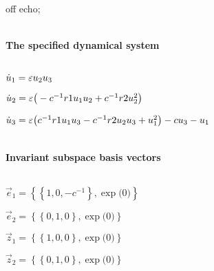 
off echo;


\(\)
\paragraph{The specified dynamical system}
\(
\)\par

\(\dot u_{1}=\varepsilon u\sb2 u\sb3
\)\par

\(\dot u_{2}=\varepsilon \big(-c^{-1} r1 u\sb1 u\sb2+c^{-1} r2 u\sb2^{2}\big)
\)\par

\(\dot u_{3}=\varepsilon \big(c^{-1} r1 u\sb1 u\sb3-c^{-1} r2 u\sb2 u\sb3+u\sb1^{
2}\big)-c u\sb3-u\sb1
\)\par

\(\)
\paragraph{Invariant subspace basis vectors}
\(
\)\par

\(\vec e_{1}=\left\{
\left\{
1 , 0 , -c^{-1}
\right\} , \exp \big(0\big)
\right\}
\)\par

\(\vec e_{2}=\left\{
\left\{
0 , 1 , 0
\right\} , \exp \big(0\big)
\right\}
\)\par

\(\vec z_{1}=\left\{
\left\{
1 , 0 , 0
\right\} , \exp \big(0\big)
\right\}
\)\par

\(\vec z_{2}=\left\{
\left\{
0 , 1 , 0
\right\} , \exp \big(0\big)
\right\}
\)\par

